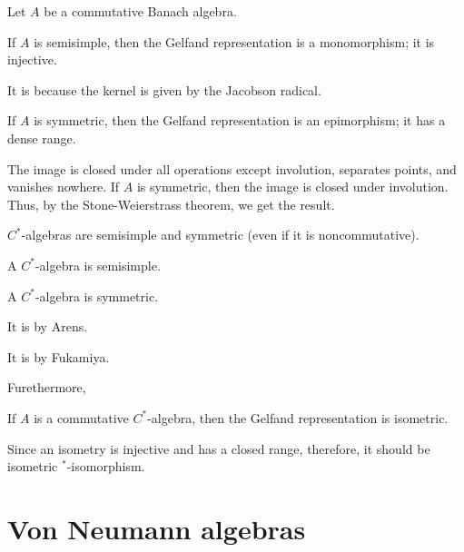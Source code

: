 \documentclass{../crs}
\begin{document}
Let $A$ be a commutative Banach algebra.
\begin{thm}
If $A$ is semisimple, then the Gelfand representation is a monomorphism; it is injective.
\end{thm}
\begin{pf}
It is because the kernel is given by the Jacobson radical.
\end{pf}
\begin{thm}
If $A$ is symmetric, then the Gelfand representation is an epimorphism; it has a dense range.
\end{thm}
\begin{pf}
The image is closed under all operations except involution, separates points, and vanishes nowhere.
If $A$ is symmetric, then the image is closed under involution.
Thus, by the Stone-Weierstrass theorem, we get the result.
\end{pf}

$C^*$-algebras are semisimple and symmetric (even if it is noncommutative).
\begin{thm}
A $C^*$-algebra is semisimple.
\end{thm}
\begin{thm}
A $C^*$-algebra is symmetric.
\end{thm}
\begin{pf}[1]
It is by Arens.
\end{pf}
\begin{pf}[2]
It is by Fukamiya.
\end{pf}
Furethermore,
\begin{thm}
If $A$ is a commutative $C^*$-algebra, then the Gelfand representation is isometric.
\end{thm}
Since an isometry is injective and has a closed range, therefore, it should be isometric $^*$-isomorphism.


\chapter{Von Neumann algebras}
\end{document}
